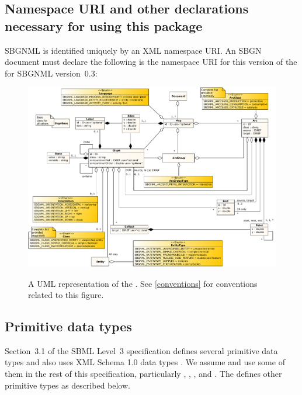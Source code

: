\subsection{Namespace URI and other declarations necessary for using this package}
\label{xml-namespace}

SBGNML is identified uniquely by an XML namespace URI. An SBGN document must declare the following is the namespace URI for this version of the
\SystemsBiologyGraphicalNotationMarkupLanguagePackage for SBGNML version~0.3:

\begin{center}
\end{center}

\begin{figure}[ht!]
  \centering
  \includegraphics[width=\textwidth]{figures/sbgnml_version_0_complete.pdf}\\
\caption{A UML representation of the \SbgnmlPackage. See
\ref{conventions} for conventions related to this figure. }
  \label{fig:sbgnml_version_0_complete}
\end{figure}

\subsection{Primitive data types}
\label{primitive-types}

Section~3.1 of the SBML Level~3 specification \citep{Hucka2019} defines several
primitive data types and also uses XML Schema 1.0 data types
\citep{biron:2000}. We assume and use some of them in the rest of this
specification, particularly , ,
, and . The
\SystemsBiologyGraphicalNotationMarkupLanguagePackage defines other
primitive types as described below.

